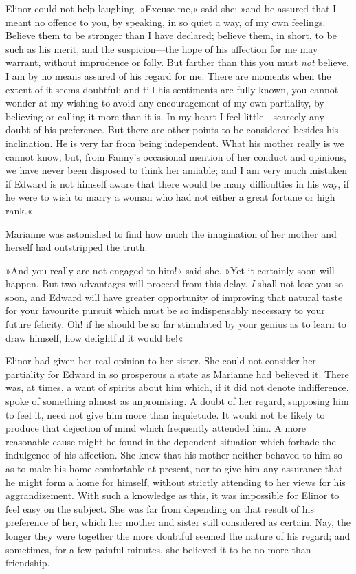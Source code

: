 Elinor could not help laughing. »Excuse me,« said she; »and be assured that I meant no offence to you, by speaking, in so quiet a way, of my own feelings. Believe them to be stronger than I have declared; believe them, in short, to be such as his merit, and the suspicion—the hope of his affection for me may warrant, without imprudence or folly. But farther than this you must \textit{not} believe. I am by no means assured of his regard for me. There are moments when the extent of it seems doubtful; and till his sentiments are fully known, you cannot wonder at my wishing to avoid any encouragement of my own partiality, by believing or calling it more than it is. In my heart I feel little—scarcely any doubt of his preference. But there are other points to be considered besides his inclination. He is very far from being independent. What his mother really is we cannot know; but, from Fanny’s occasional mention of her conduct and opinions, we have never been disposed to think her amiable; and I am very much mistaken if Edward is not himself aware that there would be many difficulties in his way, if he were to wish to marry a woman who had not either a great fortune or high rank.«

Marianne was astonished to find how much the imagination of her mother and herself had outstripped the truth.

»And you really are not engaged to him!« said she. »Yet it certainly soon will happen. But two advantages will proceed from this delay. \textit{I} shall not lose you so soon, and Edward will have greater opportunity of improving that natural taste for your favourite pursuit which must be so indispensably necessary to your future felicity. Oh! if he should be so far stimulated by your genius as to learn to draw himself, how delightful it would be!«

Elinor had given her real opinion to her sister. She could not consider her partiality for Edward in so prosperous a state as Marianne had believed it. There was, at times, a want of spirits about him which, if it did not denote indifference, spoke of something almost as unpromising. A doubt of her regard, supposing him to feel it, need not give him more than inquietude. It would not be likely to produce that dejection of mind which frequently attended him. A more reasonable cause might be found in the dependent situation which forbade the indulgence of his affection. She knew that his mother neither behaved to him so as to make his home comfortable at present, nor to give him any assurance that he might form a home for himself, without strictly attending to her views for his aggrandizement. With such a knowledge as this, it was impossible for Elinor to feel easy on the subject. She was far from depending on that result of his preference of her, which her mother and sister still considered as certain. Nay, the longer they were together the more doubtful seemed the nature of his regard; and sometimes, for a few painful minutes, she believed it to be no more than friendship.

